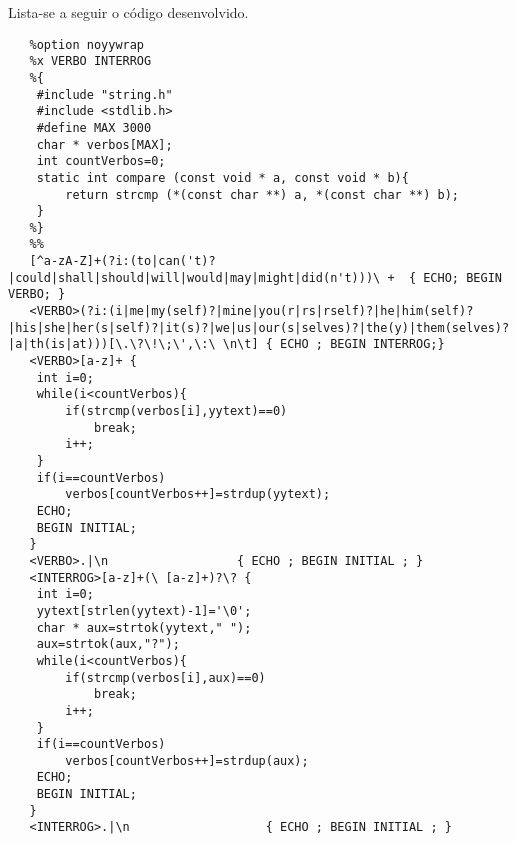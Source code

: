 \documentclass{report}
\begin{document}
Lista-se a seguir o código desenvolvido.
\\
\begin{verbatim}
   %option noyywrap
   %x VERBO INTERROG
   %{
   	#include "string.h"
   	#include <stdlib.h>
   	#define MAX 3000
   	char * verbos[MAX];
   	int countVerbos=0;
   	static int compare (const void * a, const void * b){
       	return strcmp (*(const char **) a, *(const char **) b);
   	}
   %}
   %%
   [^a-zA-Z]+(?i:(to|can('t)?|could|shall|should|will|would|may|might|did(n't)))\ +  { ECHO; BEGIN VERBO; }
   <VERBO>(?i:(i|me|my(self)?|mine|you(r|rs|rself)?|he|him(self)?|his|she|her(s|self)?|it(s)?|we|us|our(s|selves)?|the(y)|them(selves)?|a|th(is|at)))[\.\?\!\;\',\:\ \n\t] { ECHO ; BEGIN INTERROG;}
   <VERBO>[a-z]+ {
   	int i=0;
   	while(i<countVerbos){
       	if(strcmp(verbos[i],yytext)==0)
           	break;
       	i++;
   	}
   	if(i==countVerbos)
       	verbos[countVerbos++]=strdup(yytext);
   	ECHO;
   	BEGIN INITIAL;
   }
   <VERBO>.|\n                	{ ECHO ; BEGIN INITIAL ; }
   <INTERROG>[a-z]+(\ [a-z]+)?\? {
   	int i=0;
   	yytext[strlen(yytext)-1]='\0';
   	char * aux=strtok(yytext," ");
   	aux=strtok(aux,"?");
   	while(i<countVerbos){
       	if(strcmp(verbos[i],aux)==0)
           	break;
       	i++;
   	}
   	if(i==countVerbos)
       	verbos[countVerbos++]=strdup(aux);
   	ECHO;
   	BEGIN INITIAL;
   }
   <INTERROG>.|\n                	{ ECHO ; BEGIN INITIAL ; }




\end{verbatim}
\end{document}

